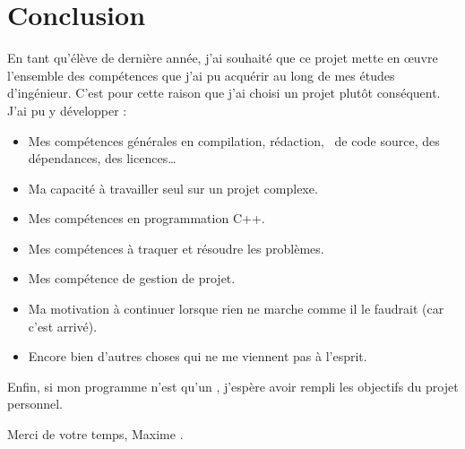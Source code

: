 \chapter{Conclusion}
En tant qu'élève de dernière année, j'ai souhaité que ce projet mette en œuvre
l'ensemble des compétences que j'ai pu acquérir au long de mes études
d'ingénieur. C'est pour cette raison que j'ai choisi un projet plutôt
conséquent. J'ai pu y développer :

\begin{itemize}
  \item Mes compétences générales en compilation, rédaction,
    \ de code source, des dépendances, des licences\ldots
  \item Ma capacité à travailler seul sur un projet complexe.
  \item Mes compétences en programmation C++.
  \item Mes compétences à traquer et résoudre les problèmes.
  \item Mes compétence de gestion de projet.
  \item Ma motivation à continuer lorsque rien ne marche comme il le faudrait
    (car c'est arrivé).
  \item Encore bien d'autres choses qui ne me viennent pas à l'esprit.\\
\end{itemize}

Enfin, si mon programme n'est qu'un , j'espère avoir
rempli les objectifs du projet personnel.

\vspace*{\fill}
\begin{flushright}
  Merci de votre temps,
  Maxime .
\end{flushright}
